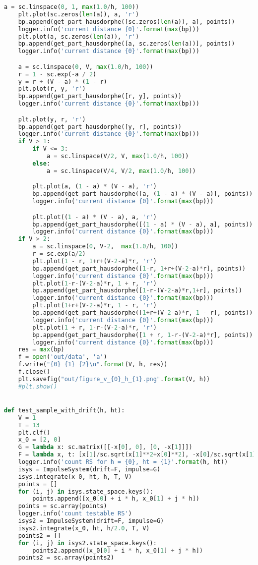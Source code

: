 \begin{lstlisting}[language=Python,
caption={Интерфейс Impulse System}]
    a = sc.linspace(0, 1, max(1.0/h, 100))
    plt.plot(sc.zeros(len(a)), a, 'r')
    bp.append(get_part_hausdorphe([sc.zeros(len(a)), a], points))
    logger.info('current distance {0}'.format(max(bp)))
    plt.plot(a, sc.zeros(len(a)), 'r')
    bp.append(get_part_hausdorphe([a, sc.zeros(len(a))], points))
    logger.info('current distance {0}'.format(max(bp)))

    a = sc.linspace(0, V, max(1.0/h, 100))
    r = 1 - sc.exp(-a / 2)
    y = r + (V - a) * (1 - r)
    plt.plot(r, y, 'r')
    bp.append(get_part_hausdorphe([r, y], points))
    logger.info('current distance {0}'.format(max(bp)))

    plt.plot(y, r, 'r')
    bp.append(get_part_hausdorphe([y, r], points))
    logger.info('current distance {0}'.format(max(bp)))
    if V > 1:
        if V <= 3:
            a = sc.linspace(V/2, V, max(1.0/h, 100))
        else:
            a = sc.linspace(V/4, V/2, max(1.0/h, 100))

        plt.plot(a, (1 - a) * (V - a), 'r')
        bp.append(get_part_hausdorphe([a, (1 - a) * (V - a)], points))
        logger.info('current distance {0}'.format(max(bp)))

        plt.plot((1 - a) * (V - a), a, 'r')
        bp.append(get_part_hausdorphe([(1 - a) * (V - a), a], points))
        logger.info('current distance {0}'.format(max(bp)))
    if V > 2:
        a = sc.linspace(0, V-2,  max(1.0/h, 100))
        r = sc.exp(a/2)
        plt.plot(1 - r, 1+r+(V-2-a)*r, 'r')
        bp.append(get_part_hausdorphe([1-r, 1+r+(V-2-a)*r], points))
        logger.info('current distance {0}'.format(max(bp)))
        plt.plot(1-r-(V-2-a)*r, 1 + r, 'r')
        bp.append(get_part_hausdorphe([1-r-(V-2-a)*r,1+r], points))
        logger.info('current distance {0}'.format(max(bp)))
        plt.plot(1+r+(V-2-a)*r, 1 - r, 'r')
        bp.append(get_part_hausdorphe([1+r+(V-2-a)*r, 1 - r], points))
        logger.info('current distance {0}'.format(max(bp)))
        plt.plot(1 + r, 1-r-(V-2-a)*r, 'r')
        bp.append(get_part_hausdorphe([1 + r, 1-r-(V-2-a)*r], points))
        logger.info('current distance {0}'.format(max(bp)))
    res = max(bp)
    f = open('out/data', 'a')
    f.write("{0} {1} {2}\n".format(V, h, res))
    f.close()
    plt.savefig("out/figure_v_{0}_h_{1}.png".format(V, h))
    #plt.show()


def test_sample_with_drift(h, ht):
    V = 1
    T = 13
    plt.clf()
    x_0 = [2, 0]
    G = lambda x: sc.matrix([[-x[0], 0], [0, -x[1]]])
    F = lambda x, t: [x[1]/sc.sqrt(x[1]**2+x[0]**2), -x[0]/sc.sqrt(x[1]**2+x[0]**2)]
    logger.info('count RS for h = {0}, ht = {1}'.format(h, ht))
    isys = ImpulseSystem(drift=F, impulse=G)
    isys.integrate(x_0, ht, h, T, V)
    points = []
    for (i, j) in isys.state_space.keys():
        points.append([x_0[0] + i * h, x_0[1] + j * h])
    points = sc.array(points)
    logger.info('count testable RS')
    isys2 = ImpulseSystem(drift=F, impulse=G)
    isys2.integrate(x_0, ht, h/2.0, T, V)
    points2 = []
    for (i, j) in isys2.state_space.keys():
        points2.append([x_0[0] + i * h, x_0[1] + j * h])
    points2 = sc.array(points2)
    

\end{lstlisting}

